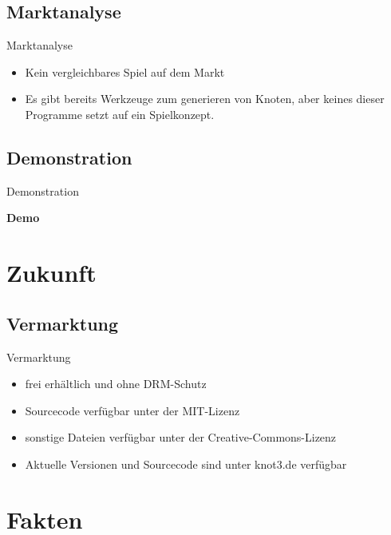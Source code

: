 \documentclass[18pt]{beamer}
\begin{document}
\subsection{Marktanalyse}
\begin{frame}{Marktanalyse}

\begin{itemize}
\item Kein vergleichbares Spiel auf dem Markt
\item Es gibt bereits Werkzeuge zum generieren von Knoten, aber keines dieser Programme setzt auf ein Spielkonzept.

\end{itemize}
\end{frame}

\subsection{Demonstration}
\begin{frame}{Demonstration}
\begin{center}
\Huge \textbf{Demo}
\end{center}

\end{frame}





\section{Zukunft}
\subsection{Vermarktung}
\begin{frame}{Vermarktung}
\begin{itemize}
\item frei erhältlich und ohne DRM-Schutz
\item Sourcecode verfügbar unter der MIT-Lizenz
\item sonstige Dateien verfügbar unter der Creative-Commons-Lizenz
\item Aktuelle Versionen und Sourcecode sind unter knot3.de verfügbar

\end{itemize}
\end{frame}

\section{Fakten}
\end{document}
